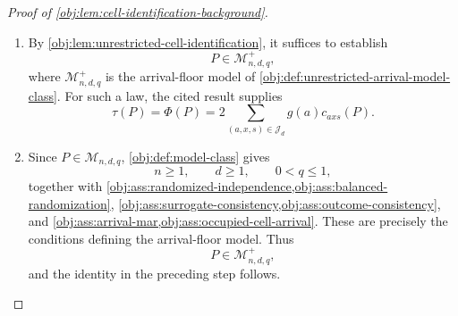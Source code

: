 \begin{proof}[Proof of \cref{obj:lem:cell-identification-background}]
\begin{enumerate}
\item By \cref{obj:lem:unrestricted-cell-identification}, it suffices to establish
\[
P\in\mathcal M^{+}_{n,d,q},
\]
where \(\mathcal M^{+}_{n,d,q}\) is the arrival-floor model of \cref{obj:def:unrestricted-arrival-model-class}. For such a law, the cited result supplies
\[
\tau(P)=\Phi(P)
=2\sum_{(a,x,s)\in\mathcal J_d}g(a)c_{axs}(P).
\]

\item Since \(P\in\mathcal M_{n,d,q}\), \cref{obj:def:model-class} gives
\[
n\ge1,\qquad d\ge1,\qquad 0<q\le1,
\]
together with
\cref{obj:ass:randomized-independence,obj:ass:balanced-randomization},
\cref{obj:ass:surrogate-consistency,obj:ass:outcome-consistency}, and
\cref{obj:ass:arrival-mar,obj:ass:occupied-cell-arrival}.
These are precisely the conditions defining the arrival-floor model. Thus
\[
P\in\mathcal M^{+}_{n,d,q},
\]
and the identity in the preceding step follows.
\end{enumerate}
\end{proof}
